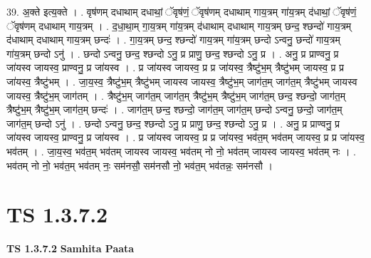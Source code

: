 \documentclass[17pt]{extarticle}
\begin{document}
39. अ॒क्ते इत्य॒क्ते । . वृष॑णम् दधाथाम् दधाथां॒ ॅवृष॑णं॒ ॅवृष॑णम् दधाथाम् गाय॒त्रम् गा॑य॒त्रम् द॑धाथां॒ ॅवृष॑णं॒ ॅवृष॑णम् दधाथाम् गाय॒त्रम् । . द॒धा॒था॒म् गा॒य॒त्रम् गा॑य॒त्रम् द॑धाथाम् दधाथाम् गाय॒त्रम् छन्द॒ श्छन्दो॑ गाय॒त्रम् द॑धाथाम् दधाथाम् गाय॒त्रम् छन्दः॑ । . गा॒य॒त्रम् छन्द॒ श्छन्दो॑ गाय॒त्रम् गा॑य॒त्रम् छन्दो ऽन्वनु॒ छन्दो॑ गाय॒त्रम् गा॑य॒त्रम् छन्दो ऽनु॑ । . छन्दो ऽन्वनु॒ छन्द॒ श्छन्दो ऽनु॒ प्र प्राणु॒ छन्द॒ श्छन्दो ऽनु॒ प्र । . अनु॒ प्र प्राण्वनु॒ प्र जा॑यस्व जायस्व॒ प्राण्वनु॒ प्र जा॑यस्व । . प्र जा॑यस्व जायस्व॒ प्र प्र जा॑यस्व॒ त्रैष्टु॑भ॒म् त्रैष्टु॑भम् जायस्व॒ प्र प्र जा॑यस्व॒ त्रैष्टु॑भम् । . जा॒य॒स्व॒ त्रैष्टु॑भ॒म् त्रैष्टु॑भम् जायस्व जायस्व॒ त्रैष्टु॑भ॒म् जाग॑त॒म् जाग॑त॒म् त्रैष्टु॑भम् जायस्व जायस्व॒ त्रैष्टु॑भ॒म् जाग॑तम् । . त्रैष्टु॑भ॒म् जाग॑त॒म् जाग॑त॒म् त्रैष्टु॑भ॒म् त्रैष्टु॑भ॒म् जाग॑त॒म् छन्द॒ श्छन्दो॒ जाग॑त॒म् त्रैष्टु॑भ॒म् त्रैष्टु॑भ॒म् जाग॑त॒म् छन्दः॑ । . जाग॑त॒म् छन्द॒ श्छन्दो॒ जाग॑त॒म् जाग॑त॒म् छन्दो ऽन्वनु॒ छन्दो॒ जाग॑त॒म् जाग॑त॒म् छन्दो ऽनु॑ । . छन्दो ऽन्वनु॒ छन्द॒ श्छन्दो ऽनु॒ प्र प्राणु॒ छन्द॒ श्छन्दो ऽनु॒ प्र । . अनु॒ प्र प्राण्वनु॒ प्र जा॑यस्व जायस्व॒ प्राण्वनु॒ प्र जा॑यस्व । . प्र जा॑यस्व जायस्व॒ प्र प्र जा॑यस्व॒ भव॑त॒म् भव॑तम् जायस्व॒ प्र प्र जा॑यस्व॒ भव॑तम् । . जा॒य॒स्व॒ भव॑त॒म् भव॑तम् जायस्व जायस्व॒ भव॑तम् नो नो॒ भव॑तम् जायस्व जायस्व॒ भव॑तम् नः । . भव॑तम् नो नो॒ भव॑त॒म् भव॑तम् नः॒ सम॑नसौ॒ सम॑नसौ नो॒ भव॑त॒म् भव॑तन्नः॒ सम॑नसौ । \newline
\pagebreak
{}

\section{ TS 1.3.7.2 }

\textbf{TS 1.3.7.2 } \newline
\textbf{Samhita Paata} \newline
\end{document}
